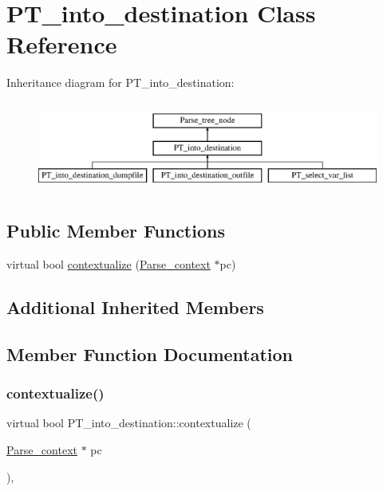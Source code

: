 \hypertarget{classPT__into__destination}{}\section{P\+T\+\_\+into\+\_\+destination Class Reference}
\label{classPT__into__destination}
Inheritance diagram for P\+T\+\_\+into\+\_\+destination\+:\begin{figure}[H]
\begin{center}
\leavevmode
\includegraphics[height=3.000000cm]{classPT__into__destination}
\end{center}
\end{figure}
\subsection*{Public Member Functions}
\begin{DoxyCompactItemize}
\item 
virtual bool \mbox{\hyperlink{classPT__into__destination_aa713703e7bae0b070f8a05bcfc0a71a3}{contextualize}} (\mbox{\hyperlink{structParse__context}{Parse\+\_\+context}} $\ast$pc)
\end{DoxyCompactItemize}
\subsection*{Additional Inherited Members}


\subsection{Member Function Documentation}
\mbox{\label{classPT__into__destination_aa713703e7bae0b070f8a05bcfc0a71a3}} 
\subsubsection{\texorpdfstring{contextualize()}{contextualize()}}
{\footnotesize\ttfamily virtual bool P\+T\+\_\+into\+\_\+destination\+::contextualize (\begin{DoxyParamCaption}\item[{\mbox{\hyperlink{structParse__context}{Parse\+\_\+context}} $\ast$}]{pc }\end{DoxyParamCaption})\hspace{0.3cm}{\ttfamily [inline]}, {\ttfamily [virtual]}}

